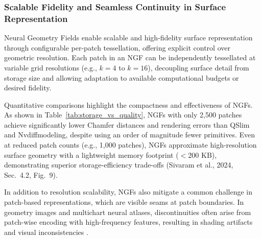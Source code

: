 \subsubsection{Scalable Fidelity and Seamless Continuity in Surface Representation}

Neural Geometry Fields enable scalable and high-fidelity surface representation through configurable per-patch tessellation, offering explicit control over geometric resolution. 
Each patch in an NGF can be independently tessellated at variable grid resolutions (e.g., $k=4$ to $k=16$), decoupling surface detail from storage size and allowing adaptation to available computational budgets or desired fidelity. 

Quantitative comparisons highlight the compactness and effectiveness of NGFs. 
As shown in Table~\ref{tab:storage_vs_quality}, NGFs with only 2,500 patches achieve significantly lower Chamfer distances and rendering errors than QSlim and Nvdiffmodeling, despite using an order of magnitude fewer primitives. 
Even at reduced patch counts (e.g., 1,000 patches), NGFs approximate high-resolution surface geometry with a lightweight memory footprint ($<$200 KB), demonstrating superior storage-efficiency trade-offs (Sivaram et al., 2024, Sec.~4.2, Fig.~9). 

\begin{table}[h]
\caption{Storage vs. visual quality on the Ganesha model. Inspired by Sivaram et al. (2024), Table 2 and Fig. 7.}
\centering
{}
\end{table}

In addition to resolution scalability, NGFs also mitigate a common challenge in patch-based representations, which are visible seams at patch boundaries. 
In geometry images and multichart neural atlases, discontinuities often arise from patch-wise encoding with high-frequency features, resulting in shading artifacts and visual inconsistencies \cite{Gu2002}. 

